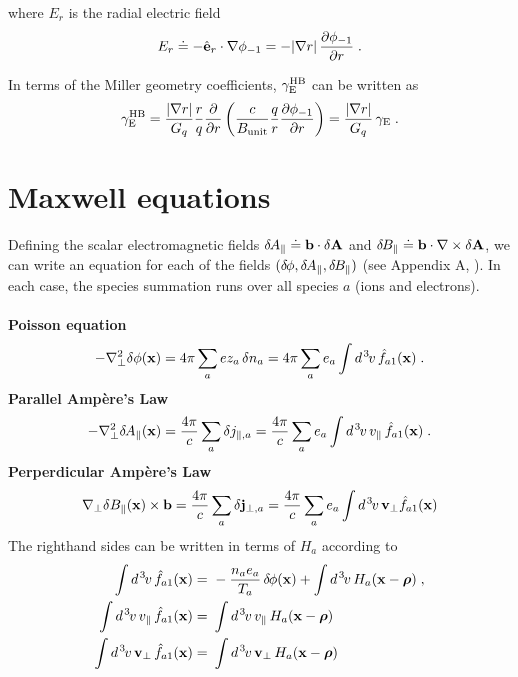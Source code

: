\noindent
where $E_r$ is the radial electric field 
%
\begin{equation}
E_r \doteq - \hat{{\bf e}}_r \cdot \nabla \phi_{-1} 
    = - |\nabla r| \, \frac{\partial\phi_{-1}}{\partial r} \; . 
\end{equation}

\noindent
In terms of the Miller geometry coefficients, 
$\gamma_{\rm E}^{\rm HB}$ can be written as 
%
\begin{equation}
\gamma_{\rm E}^{\rm HB} = 
  \frac{|\nabla r|}{G_q} \frac{r}{q} \frac{\partial}{\partial r} 
  \left( \frac{c}{B_{\rm unit}} \frac{q}{r} \frac{\partial \phi_{-1}}{\partial r} 
  \right) = 
   \frac{|\nabla r|}{G_q} \, \gamma_{\rm E} \; .
\end{equation}

\section{Maxwell equations}

Defining the scalar electromagnetic fields $\delta \hskip -1pt A_\parallel \doteq \mathbf{b} \cdot \delta {\bf A}$ 
and $\delta \hskip -1pt B_\parallel \doteq \mathbf{b} \cdot \nabla \times \delta {\bf A}$, we can write an 
equation for each of the fields $(\delta \hskip -1pt \phi,\delta \hskip -1pt A_\parallel,\delta \hskip -1pt B_\parallel)$ (see Appendix A, 
\cite{sugama:1998}).  In each case, the species summation runs over all 
species $a$ (ions and electrons).\\
\\
%
{\bf Poisson equation}
%
\begin{equation}
-\nabla_\perp^2 \delta\phi({\bf x}) = 4\pi \sum_a e z_a \, \delta n_a 
  = 4\pi \sum_a e_a \int d^{\hskip 1pt 3} \hskip -1pt v \, {\hat f}_{a1}({\bf x}) \; .
\end{equation}
%
{\bf Parallel Amp\`ere's Law}
%
\begin{equation}
-\nabla_\perp^2 \delta \hskip -1pt A_\parallel({\bf x}) = \frac{4\pi}{c} \sum_a \delta j_{\parallel,a} = 
\frac{4\pi}{c} \sum_a e_a \int d^{\hskip 1pt 3} \hskip -1pt v \, v_\parallel \, {\hat f}_{a1}({\bf x}) \; .
\end{equation}
%
{\bf Perperdicular Amp\`ere's Law}
%
\begin{equation}
\nabla_\perp \delta B_\parallel({\bf x}) \times \mathbf{b} 
= \frac{4 \pi}{c} \sum_a \delta {\bf j}_{\perp,a}
= \frac{4 \pi}{c} \sum_a 
e_a \int d^{\hskip 1pt 3} \hskip -1pt v \, \mathbf{v}_\perp {\hat f}_{a1}({\bf x}) 
\end{equation}
%
The righthand sides can be written in terms of $H_a$ according to
%
\begin{align}
\int d^{\hskip 1pt 3} \hskip -1pt v \, {\hat f}_{a1}({\bf x}) = &~ -\frac{n_a e_a}{T_a} \, \delta \hskip -1pt \phi({\bf x}) + 
\int d^{\hskip 1pt 3} \hskip -1pt v \, H_a({\bf x}-\boldsymbol{\rho}) \; , \\
\int d^{\hskip 1pt 3} \hskip -1pt v \, v_\parallel \, {\hat f}_{a1}({\bf x}) = &~ \int d^{\hskip 1pt 3} \hskip -1pt v \, v_\parallel \, H_a({\bf x}-\boldsymbol{\rho}) \\
\int d^{\hskip 1pt 3} \hskip -1pt v \, \mathbf{v}_\perp \, {\hat f}_{a1}({\bf x}) = &~ \int d^{\hskip 1pt 3} \hskip -1pt v \, 
 \mathbf{v}_\perp \, H_a({\bf x}-\boldsymbol{\rho})
\end{align}

